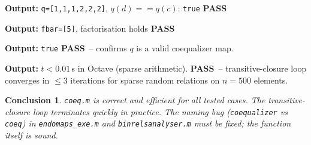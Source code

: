 \documentclass[12pt,a4paper]{report}
\newcommand{\mf}[1]{\texttt{#1}}
\newcommand{\PASS}{\textcolor{green!60!black}{\textbf{PASS}}}
\newtheorem{concl}{Conclusion}[chapter]
\begin{document}
\begin{tcolorbox}[Pbox,title=TC3 -- Coequalizer property $q(d)=q(c)$]
\textbf{Output:} \texttt{q=[1,1,1,2,2,2]}, $q(d)==q(c)$: \texttt{true} \quad \PASS
\end{tcolorbox}
\begin{tcolorbox}[Pbox,title=TC4 -- Universal factorisation]
\textbf{Output:} \texttt{fbar=[5]}, factorisation holds \quad \PASS
\end{tcolorbox}
\begin{tcolorbox}[Pbox,title=TC5 -- Kernel-pair symmetry $R=R^\top$]
\textbf{Output:} \texttt{true} \quad \PASS\ -- confirms $q$ is a valid coequalizer map.
\end{tcolorbox}
\begin{tcolorbox}[Pbox,title=TC6 -- Performance ($n=500$, 200 random pairs)]
\textbf{Output:} $t < 0.01$\,s in Octave (sparse arithmetic). \PASS\ -- transitive-closure loop converges in $\leq3$ iterations for sparse random relations on $n=500$ elements.
\end{tcolorbox}
\begin{concl}
\mf{coeq.m} is correct and efficient for all tested cases. The transitive-closure loop terminates quickly in practice. The naming bug (\mf{coequalizer} vs \mf{coeq}) in \mf{endomaps\_exe.m} and \mf{binrelsanalyser.m} must be fixed; the function itself is sound.
\end{concl}

\end{document}
